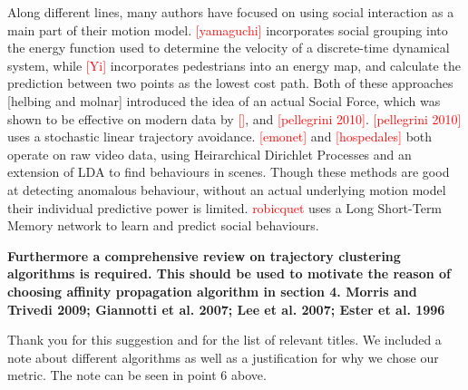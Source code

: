 \documentclass[usenames,dvipsnames]{article}
\newcommand{\todo}[1]{\textcolor{red}{#1}}
\providecommand{\response}[1]{
\noindent
\noindent\colorbox{gray!20}{
\parbox{\textwidth}{
\setlength{\parskip}{.1in}
\setlength{\parindent}{.1in}
#1}
}
}
\begin{document}
\begin{enumerate}
	\response{Along different lines, many authors have focused on using social interaction as a main part of their motion model. \todo{[yamaguchi]} incorporates social grouping into the energy function used to determine the velocity of a discrete-time dynamical system, while \todo{[Yi]} incorporates pedestrians into an energy map, and calculate the prediction between two points as the lowest cost path. Both of these approaches  [helbing and molnar] introduced the idea of an actual Social Force, which was shown to be effective on modern data by \todo{[]}, and \todo{[pellegrini 2010]}. \todo{[pellegrini 2010]} uses a stochastic linear trajectory avoidance.  \todo{[emonet]} and \todo{[hospedales]} both operate on raw video data, using Heirarchical Dirichlet Processes and an extension of LDA to find behaviours in scenes. Though these methods are good at detecting anomalous behaviour, without an actual underlying motion model their individual predictive power is limited. \todo{robicquet} uses a Long Short-Term Memory network to learn and predict social behaviours. }

\begin{item}
\textbf{Furthermore a comprehensive review on trajectory clustering algorithms
is required. This should be used to motivate the reason of choosing
affinity propagation algorithm in section 4. 
Morris and Trivedi 2009; Giannotti et al. 2007; Lee et al. 2007;
Ester et al. 1996 }

Thank you for this suggestion and for the list of relevant titles. We included a note about different algorithms as well as a justification for why we chose our metric. The note can be seen in point 6 above.

\end{item}
\end{enumerate}
\end{document}
